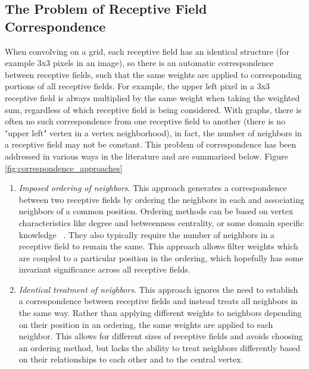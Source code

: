 \subsection{The Problem of Receptive Field Correspondence}
When convolving on a grid, each receptive field has an identical structure (for example 3x3 pixels in an image), so there is an automatic correspondence between receptive fields, such  that the same weights are applied to corresponding portions of all receptive fields. 
For example, the upper left pixel in a 3x3 receptive field is always multiplied by the same weight when taking the weighted sum, regardless of which receptive field is being considered.
With graphs, there is often no such correspondence from one receptive field to another (there is no "upper left" vertex in a vertex neighborhood), in fact, the number of neighbors in a receptive field may not be constant.
This problem of correspondence has been addressed in various ways in the literature and are summarized below. Figure \ref{fig:correspondence_approaches}
\begin{enumerate}
	\item \textit{Imposed ordering of neighbors}. This approach generates a correspondence between two receptive fields by ordering the neighbors in each and associating neighbors of a common position. 
	Ordering methods can be based on vertex characteristics like degree and betweenness centrality, or some domain specific knowledge ~\cite{niepert2016}\cite{duvenaud2015}.
	They also typically require the number of neighbors in a receptive field to remain the same.
	This approach allows filter weights which are coupled to a particular position in the ordering, which hopefully has some invariant significance across all receptive fields.
	
	\item \textit{Identical treatment of neighbors}. This approach ignores the need to establish a correspondence between receptive fields and instead treats all neighbors in the same way.
	Rather than applying different weights to neighbors depending on their position in an ordering, the same weights are applied to each neighbor.
	This allows for different sizes of receptive fields and avoids choosing an ordering method, but lacks the ability to treat neighbors differently based on their relationships to each other and to the central vertex.
\end{enumerate}

